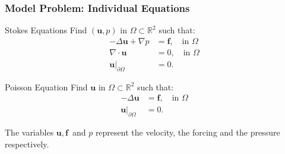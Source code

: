\documentclass{beamer}
\theoremstyle{definition}
\begin{document}
\begin{frame}
\frametitle{Model Problem: Individual Equations }
\begin{block}{Stokes Equations}
	Find $\left(\textbf{u},p\right)$ in $\Omega \subset \mathbb{R}^2$ such that: \vspace{-3mm}\begin{equation}\label{stokes_eq}
	\begin{aligned}
	-\Delta\textbf{u} + \nabla p &= \textbf{f}, \quad \text{in } \Omega \\ 
	\nabla\cdot \textbf{u}&= 0, \quad \text{in } \Omega\\ 
	\textbf{u}|_{\partial\Omega}&=0.
	\end{aligned}
	\end{equation}
\end{block}
\begin{block}{Poisson Equation}
	Find $\textbf{u}$ in $\Omega \subset \mathbb{R}^2$ such that:\vspace{-3mm}
	\begin{equation}\label{laplace_eq}
	\begin{aligned}
	-\Delta\textbf{u} &= \textbf{f}, \quad \text{in } \Omega \\ 
	\textbf{u}|_{\partial\Omega}&=0.
	\end{aligned}
	\end{equation}
\end{block}
The variables $\textbf{u},\, \textbf{f}$ and $p$ represent the velocity, the forcing and the pressure respectively.      
\end{frame}
\end{document}
